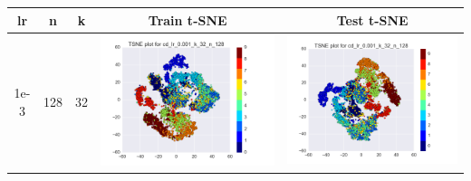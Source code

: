 \documentclass[12pt]{report}
\begin{document}
\begin{table}[H]
  \centering
  \begin{tabular}{ | c | c | c | c || c |}
    \hline
    \textbf{lr} & \textbf{n} & \textbf{k} & \textbf{Train t-SNE} & \textbf{Test t-SNE}\\ \hline
    1e-3 & 128 & 32 &
    \begin{minipage}{.3\textwidth}
      \includegraphics[scale=0.25]{cd_lr_0_001_k_32_n_128.png}
    \end{minipage} &
    \begin{minipage}{.3\textwidth}
      \includegraphics[scale=0.25]{test_cd_lr_0_001_k_32_n_128.png}
    \end{minipage}
   \\ \hline
  \end{tabular}
\end{table}
\end{document}
